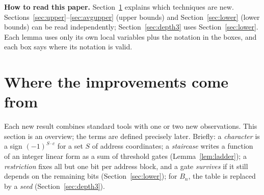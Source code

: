 \documentclass[11pt,letterpaper]{article}
\theoremstyle{remark}
\newcommand{\sect}[1]{\section{\texorpdfstring{\color{ink}#1}{#1}}}
\newcommand{\smalltitle}[1]{\textbf{\color{ink}#1}\quad}
\begin{document}
\smalltitle{How to read this paper.}
Section~\ref{sec:tech} explains which techniques are new.
Sections~\ref{sec:upper}--\ref{sec:avgupper} (upper bounds) and
Section~\ref{sec:lower} (lower bounds) can be read independently;
Section~\ref{sec:depth3} uses Section~\ref{sec:lower}. Each lemma uses only
its own local variables plus the notation in the boxes, and each box says
where its notation is valid.

\sect{Where the improvements come from}\label{sec:tech}

Each new result combines standard tools with one or two new observations.
This section is an overview; the terms are defined precisely later. Briefly:
a \emph{character} is a sign $(-1)^{S\cdot c}$ for a set $S$ of address
coordinates; a \emph{staircase} writes a function of an integer linear form as
a sum of threshold gates (Lemma~\ref{lem:ladder}); a \emph{restriction} fixes
all but one bit per address block, and a gate \emph{survives} if it still
depends on the remaining bits (Section~\ref{sec:lower}); for $B_n$, the
table is replaced by a \emph{seed} (Section~\ref{sec:depth3}).
\end{document}
